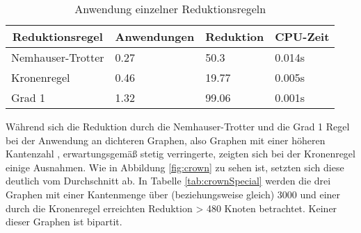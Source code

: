 \begin{table}[htb]
\caption{Anwendung einzelner Reduktionsregeln\label{tab:anwendung}}
\vspace*{1em}
\centering

\bgroup
\def\arraystretch{1.3}%


\begin{tabular}[c]{l|l|l|l}
	
	\multicolumn{1}{c|}{\textbf{Reduktionsregel}} & 
	\multicolumn{1}{c|}{\textbf{Anwendungen}} & 
	\multicolumn{1}{c|}{\textbf{Reduktion}} & 
	\multicolumn{1}{c}{\textbf{CPU-Zeit }} \\ 
	
	\hline

	Nemhauser-Trotter& 0.27 &  50.3 & 0.014s\\
	Kronenregel& 0.46 & 19.77 & 0.005s\\
	Grad 1&1.32 & 99.06 & 0.001s\\
	
\end{tabular}

\egroup

\end{table}
Während sich die Reduktion durch die Nemhauser-Trotter und die Grad 1 Regel bei der Anwendung an dichteren Graphen, also Graphen mit einer höheren Kantenzahl \cite{dummy}, erwartungsgemäß stetig verringerte, zeigten sich bei der Kronenregel einige Ausnahmen. Wie in Abbildung \ref{fig:crown} zu sehen ist, setzten sich diese deutlich vom Durchschnitt ab. In Tabelle \ref{tab:crownSpecial} werden die drei Graphen mit einer Kantenmenge über (beziehungsweise gleich) 3000 und einer durch die Kronenregel erreichten Reduktion > 480 Knoten betrachtet. Keiner dieser Graphen ist bipartit.
